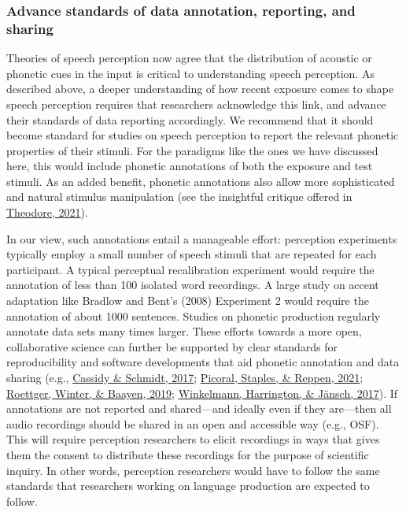 \documentclass[
  11pt,
  man,floatsintext]{apa6}
\begin{document}
\hypertarget{advance-standards-of-data-annotation-reporting-and-sharing}{%
\subsubsection{Advance standards of data annotation, reporting, and sharing}\label{advance-standards-of-data-annotation-reporting-and-sharing}}

Theories of speech perception now agree that the distribution of acoustic or phonetic cues in the input is critical to understanding speech perception. As described above, a deeper understanding of how recent exposure comes to shape speech perception requires that researchers acknowledge this link, and advance their standards of data reporting accordingly. We recommend that it should become standard for studies on speech perception to report the relevant phonetic properties of their stimuli. For the paradigms like the ones we have discussed here, this would include phonetic annotations of both the exposure and test stimuli. As an added benefit, phonetic annotations also allow more sophisticated and natural stimulus manipulation (see the insightful critique offered in \protect\hyperlink{ref-theodore2021}{Theodore, 2021}).

In our view, such annotations entail a manageable effort: perception experiments typically employ a small number of speech stimuli that are repeated for each participant. A typical perceptual recalibration experiment would require the annotation of less than 100 isolated word recordings. A large study on accent adaptation like Bradlow and Bent's (2008) Experiment 2 would require the annotation of about 1000 sentences. Studies on phonetic production regularly annotate data sets many times larger. These efforts towards a more open, collaborative science can further be supported by clear standards for reproducibility and software developments that aid phonetic annotation and data sharing (e.g., \protect\hyperlink{ref-cassidy-schmidt2017}{Cassidy \& Schmidt, 2017}; \protect\hyperlink{ref-picoral2021}{Picoral, Staples, \& Reppen, 2021}; \protect\hyperlink{ref-roettger2019}{Roettger, Winter, \& Baayen, 2019}; \protect\hyperlink{ref-winkelmann2017}{Winkelmann, Harrington, \& Jänsch, 2017}). If annotations are not reported and shared---and ideally even if they are---then all audio recordings should be shared in an open and accessible way (e.g., OSF). This will require perception researchers to elicit recordings in ways that gives them the consent to distribute these recordings for the purpose of scientific inquiry. In other words, perception researchers would have to follow the same standards that researchers working on language production are expected to follow.
\end{document}
